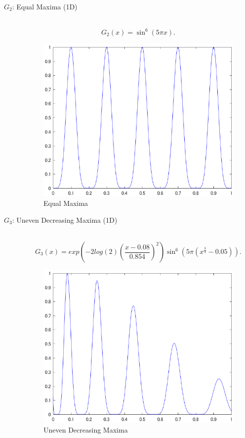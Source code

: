 \documentclass[a4j,11pt]{jarticle}
\begin{document}
\begin{description}
\item[$G_2$: Equal Maxima (1D)]\mbox{}\\
\begin{equation}
\label{eq:maxF2}
G_2(x)=\sin^6{(5\pi x)}.
\end{equation}
\begin{figure}[h]
\centering
\includegraphics[width=0.8\linewidth]{eps/F2.eps}
\caption{Equal Maxima}
\label{fig:maxF2}
\end{figure}

\item[$G_3$: Uneven Decreasing Maxima (1D)]\mbox{}\\
\begin{equation}
\label{eq:maxF3}
G_3(x)=exp(-2log(2)(\frac{x-0.08}{0.854})^2)\sin^6{(5\pi(x^{\frac{3}{4}}-0.05))}.
\end{equation}
\begin{figure}[h]
\centering
\includegraphics[width=0.8\linewidth]{eps/F3.eps}
\caption{Uneven Decreasing Maxima}
\label{fig:maxF3}
\end{figure}


\end{description}
\end{document}
